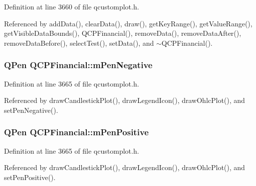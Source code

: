 Definition at line 3660 of file qcustomplot.\+h.



Referenced by add\+Data(), clear\+Data(), draw(), get\+Key\+Range(), get\+Value\+Range(), get\+Visible\+Data\+Bounds(), Q\+C\+P\+Financial(), remove\+Data(), remove\+Data\+After(), remove\+Data\+Before(), select\+Test(), set\+Data(), and $\sim$\+Q\+C\+P\+Financial().

\hypertarget{class_q_c_p_financial_a263fbfefde2cc19c8d4024a8319c2bbb}{}
\subsubsection[{m\+Pen\+Negative}]{\setlength{\rightskip}{0pt plus 5cm}Q\+Pen Q\+C\+P\+Financial\+::m\+Pen\+Negative\hspace{0.3cm}{\ttfamily [protected]}}\label{class_q_c_p_financial_a263fbfefde2cc19c8d4024a8319c2bbb}


Definition at line 3665 of file qcustomplot.\+h.



Referenced by draw\+Candlestick\+Plot(), draw\+Legend\+Icon(), draw\+Ohlc\+Plot(), and set\+Pen\+Negative().

\hypertarget{class_q_c_p_financial_aa6599186f417ba615caebb3f6c762bd8}{}
\subsubsection[{m\+Pen\+Positive}]{\setlength{\rightskip}{0pt plus 5cm}Q\+Pen Q\+C\+P\+Financial\+::m\+Pen\+Positive\hspace{0.3cm}{\ttfamily [protected]}}\label{class_q_c_p_financial_aa6599186f417ba615caebb3f6c762bd8}


Definition at line 3665 of file qcustomplot.\+h.



Referenced by draw\+Candlestick\+Plot(), draw\+Legend\+Icon(), draw\+Ohlc\+Plot(), and set\+Pen\+Positive().

\hypertarget{class_q_c_p_financial_a6afe919190b884d9bac026cefcc8c0a8}{}
